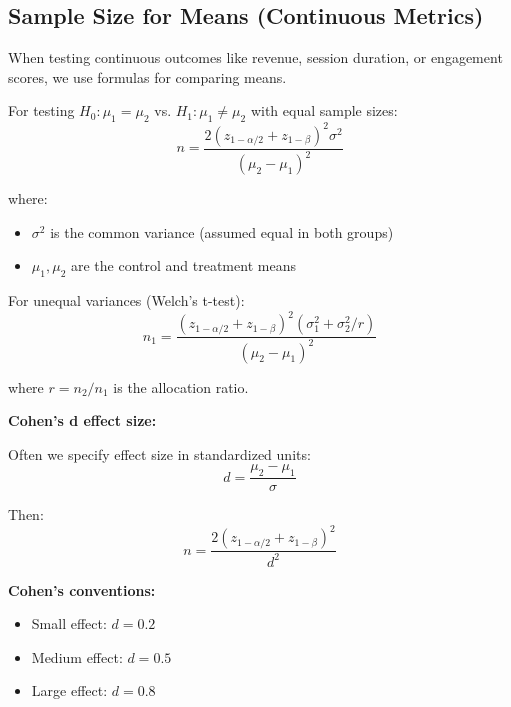 \subsection{Sample Size for Means (Continuous Metrics)}

When testing continuous outcomes like revenue, session duration, or engagement scores, we use formulas for comparing means.

\begin{theorem}
For testing $H_0: \mu_1 = \mu_2$ vs. $H_1: \mu_1 \neq \mu_2$ with equal sample sizes:
\begin{equation}
n = \frac{2(z_{1-\alpha/2} + z_{1-\beta})^2 \sigma^2}{(\mu_2 - \mu_1)^2}
\end{equation}

where:
\begin{itemize}
    \item $\sigma^2$ is the common variance (assumed equal in both groups)
    \item $\mu_1, \mu_2$ are the control and treatment means
\end{itemize}

For unequal variances (Welch's t-test):
\begin{equation}
n_1 = \frac{(z_{1-\alpha/2} + z_{1-\beta})^2 (\sigma_1^2 + \sigma_2^2 / r)}{(\mu_2 - \mu_1)^2}
\end{equation}

where $r = n_2/n_1$ is the allocation ratio.
\end{theorem}

\textbf{Cohen's d effect size:}

Often we specify effect size in standardized units:
\begin{equation}
d = \frac{\mu_2 - \mu_1}{\sigma}
\end{equation}

Then:
\begin{equation}
n = \frac{2(z_{1-\alpha/2} + z_{1-\beta})^2}{d^2}
\end{equation}

\textbf{Cohen's conventions:}
\begin{itemize}
    \item Small effect: $d = 0.2$
    \item Medium effect: $d = 0.5$
    \item Large effect: $d = 0.8$
\end{itemize}

